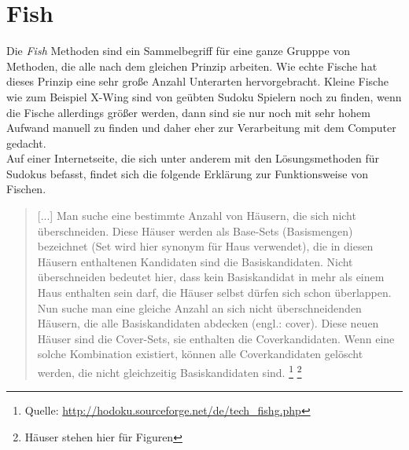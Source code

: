\newpage
\section{Fish}
\label{Fish}
Die \textit{Fish} Methoden sind ein Sammelbegriff für eine ganze Grupppe von Methoden, die alle nach dem gleichen Prinzip arbeiten. Wie echte Fische hat dieses Prinzip eine sehr große Anzahl Unterarten hervorgebracht. Kleine Fische wie zum Beispiel X-Wing sind von geübten Sudoku Spielern noch zu finden, wenn die Fische allerdings größer werden, dann sind sie nur noch mit sehr hohem Aufwand manuell zu finden und daher eher zur Verarbeitung mit dem Computer gedacht. \\
Auf einer Internetseite, die sich unter anderem mit den Lösungsmethoden für Sudokus befasst, findet sich die folgende Erklärung zur Funktionsweise von Fischen.

\begin{quote}[...] Man suche eine bestimmte Anzahl von Häusern, die sich nicht überschneiden. Diese Häuser werden als Base-Sets (Basismengen) bezeichnet (Set wird hier synonym für Haus verwendet), die in diesen Häusern enthaltenen Kandidaten sind die Basiskandidaten. Nicht überschneiden bedeutet hier, dass kein Basiskandidat in mehr als einem Haus enthalten sein darf, die Häuser selbst dürfen sich schon überlappen. Nun suche man eine gleiche Anzahl an sich nicht überschneidenden Häusern, die alle Basiskandidaten abdecken (engl.: cover). Diese neuen Häuser sind die Cover-Sets, sie enthalten die Coverkandidaten. Wenn eine solche Kombination existiert, können alle Coverkandidaten gelöscht werden, die nicht gleichzeitig Basiskandidaten sind.
\footnote{Quelle: \url{http://hodoku.sourceforge.net/de/tech_fishg.php}}
\footnote{Häuser stehen hier für Figuren}
\end{quote}